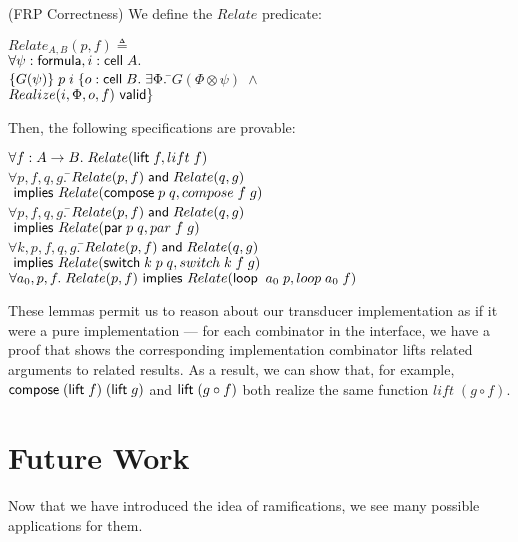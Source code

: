 \documentclass[preprint,natbib]{sigplanconf}
\begin{document}
\begin{prop}{(FRP Correctness)}
We define the $Relate$ predicate:
\begin{tabbing}
$Relate_{A,B}(p, f) \triangleq$ \\
\;\; $\forall \psi:\mbox{\textsf{{formula}}}, i:\mbox{\textsf{{cell}}}\;{A}.$ \\ 
\qquad $\{{G(\psi)}\}\;p\;i\;\{o:\mbox{\textsf{{cell}}}\;{B}.\;
               \exists \Phi.\;$\=$G(\Phi \otimes \psi) \;\land$ \\
                               \>$ Realize(i, \Phi, o, f) \mbox{\textsf{{ valid}}}\}$
\end{tabbing}
\noindent Then, the following specifications are provable: 
\begin{tabbing}
$\forall f:A\to B.\; Relate(\mbox{\textsf{{lift}}}\; f, lift\;f)$ \\[1em]

$\forall p, f, q, g.\;$\=$Relate(p, f) \;\mbox{\textsf{{and}}}\; Relate(q, g)$ \\
                       \>$\mbox{\textsf{{ implies }}} Relate(\mbox{\textsf{{compose}}}\; p\;q, compose\;f\;g)$ \\[1em]

$\forall p, f, q, g.\;$\=$Relate(p, f) \;\mbox{\textsf{{and}}}\; Relate(q, g)$ \\
                       \>$\mbox{\textsf{{ implies }}} Relate(\mbox{\textsf{{par}}}\; p\;q, par\;f\;g)$ \\[1em]

$\forall k, p, f, q, g.\;$\=$Relate(p, f) \;\mbox{\textsf{{and}}}\; Relate(q, g)$ \\
                          \>$\mbox{\textsf{{ implies }}} Relate(\mbox{\textsf{{switch}}}\; k\;p\;q, switch\;k\;f\;g)$ \\[1em]

$\forall a_0, p, f.\; 
  Relate(p, f) \mbox{\textsf{{ implies }}} Relate(\mbox{\textsf{{loop}}}\;\;a_0\;p, loop\;a_0\;f)$
\end{tabbing}
\end{prop}

These lemmas permit us to reason about our transducer implementation
as if it were a pure implementation --- for each combinator in the
interface, we have a proof that shows the corresponding implementation
combinator lifts related arguments to related results. As a result, 
we can show that, for example, $\mbox{\textsf{{compose}}}\; (\mbox{\textsf{{lift}}}\; f) \;(\mbox{\textsf{{lift}}}\; g)$
and $\mbox{\textsf{{lift}}}\; (g \circ f)$ both realize the same function $lift\;(g\circ f)$. 

\section{Future Work}

Now that we have introduced the idea of ramifications, we see many
possible applications for them. 
\end{document}

